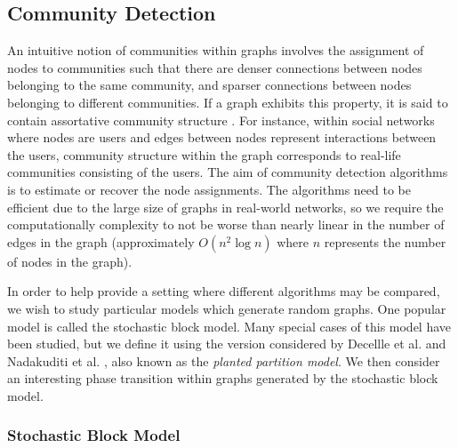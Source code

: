 \documentclass[12pt]{article}
\numberwithin{equation}{section}
\begin{document}
\subsection{Community Detection}
\label{sec:background;subsec:communityDetection}

An intuitive notion of communities within graphs involves the assignment of nodes to communities such that there are denser connections between nodes belonging to the same community, and sparser connections between nodes belonging to different communities. If a graph exhibits this property, it is said to contain assortative community structure \cite{New06a,DKM+13,For10,New06b}. For instance, within social networks where nodes are users and edges between nodes represent interactions between the users, community structure within the graph corresponds to real-life communities consisting of the users. The aim of community detection algorithms is to estimate or recover the node assignments. The algorithms need to be efficient due to the large size of graphs in real-world networks, so we require the computationally complexity to not be worse than nearly linear in the number of edges in the graph (approximately $O(n^{2}\log n)$ where $n$ represents the number of nodes in the graph).

In order to help provide a setting where different algorithms may be compared, we wish to study particular models which generate random graphs. One popular model is called the stochastic block model. Many special cases of this model have been studied, but we define it using the version considered by Decellle et al. \cite{DKM+13} and Nadakuditi et al. \cite{NN12}, also known as the \textit{planted partition model}. We then consider an interesting phase transition within graphs generated by the stochastic block model.

\subsubsection{Stochastic Block Model}
\label{sec:background;subsec:communityDetection;subsubsec:stochasticBlockModel}
\end{document}
